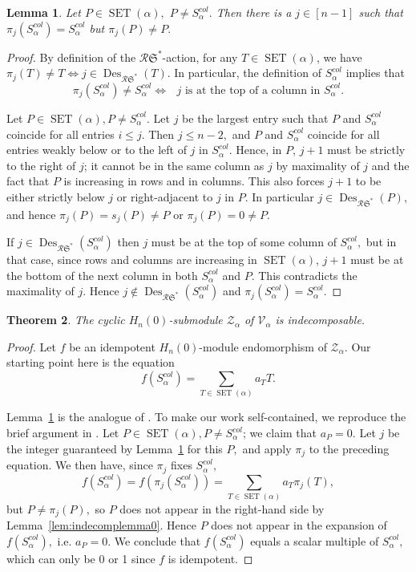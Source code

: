 \documentclass[12pt,letterpaper]{amsart}
\newtheorem{theorem}{Theorem}[section]
\newtheorem{lemma}[theorem]{Lemma}
\theoremstyle{definition}
\newcommand{\rdI}{\mathcal{R}\mathfrak{S}^*}
\DeclareMathOperator{\Des}{Des}
\newcommand{\SET}{\ensuremath{\operatorname{SET}}} \newcommand{\NSET}{\ensuremath{\operatorname{NSET}}}\newcommand{\SRCT}{\ensuremath{\operatorname{SRCT}}}
\newcommand{\hn}{H_n(0)}
\begin{document}
\begin{lemma}\label{lem:Z-indecomplemma} Let $P\in\SET(\alpha),$ $P\ne S^{col}_\alpha.$ Then there is a $j\in [n-1]$ such that $\pi_j(S^{col}_\alpha)=S^{col}_\alpha$ but $\pi_j(P)\ne P.$
\end{lemma}
\begin{proof} By definition of the $\rdI$-action, for any $T\in \SET(\alpha)$, we have 
$\pi_j(T)\ne T\iff j\in \Des_{\rdI}(T).$  In particular, the definition of $S^{col}_\alpha$ implies that 
\[\pi_j(S^{col}_\alpha)\ne S^{col}_\alpha \iff \text{ $j$ is at the top of a column in }S^{col}_\alpha.\]

Let $P\in\SET(\alpha), P\ne S^{col}_\alpha.$  Let $j$ be the largest entry such that $P$ and $S^{col}_\alpha$ coincide for all entries $i\le j.$ Then $j\le n-2,$ and $P$ and $S^{col}_\alpha$ coincide for all entries weakly below or to the left of $j$ in $S^{col}_\alpha.$ Hence, in $P$,  $j+1$ must be strictly to the right of $j$; it cannot be in the same column as $j$ by maximality of $j$ and the fact that $P$ is increasing in rows and in columns.  This also forces  $j+1$ to be either strictly below $j$  or right-adjacent to $j$ in $P$.  In particular $j\in \Des_{\rdI}(P),$ and hence  $\pi_j(P)=s_j(P)\ne P$ or  $\pi_j(P)= 0\ne P$.

If $j\in \Des_{\rdI}(S^{col}_\alpha)$ then $j$ must be at the top of some column of $S^{col}_\alpha,$ but in that case,
 since rows and columns are increasing in $\SET(\alpha)$, $j+1$ must be at the bottom of the next column in both $S^{col}_\alpha$ and $P.$ This contradicts the maximality of $j.$  Hence $j\notin \Des_{\rdI}(S^{col}_\alpha)$ and 
$\pi_j(S^{col}_\alpha)=S^{col}_\alpha.$
\end{proof}

\begin{theorem}\label{thm:Z-indecomp} The cyclic  $\hn$-submodule $\mathcal{Z}_\alpha$ of $\mathcal{V}_\alpha$ is indecomposable.
\end{theorem}

\begin{proof}  Let $f$ be an idempotent $\hn$-module endomorphism of $\mathcal{Z}_\alpha.$ 
Our starting point here is the equation 
\[f(S^{col}_\alpha)=\sum_{T\in\SET(\alpha)} a_T T.\]

Lemma~\ref{lem:Z-indecomplemma} is the analogue of 
\cite[Lemma~3.11]{BBSSZ2015}.
To make our work self-contained, we reproduce  the brief argument in \cite[Theorem~3.12]{BBSSZ2015}.   
Let $P\in \SET(\alpha), P\ne S^{col}_\alpha$; we claim that $a_P= 0.$ Let $j$ be the integer guaranteed by Lemma~\ref{lem:Z-indecomplemma} for this $P,$ and apply $\pi_j$ to the preceding equation.  We then have, since $\pi_j$ fixes $S^{col}_\alpha,$ 
\[f(S^{col}_\alpha)=f(\pi_j(S^{col}_\alpha))=\sum_{T\in \SET(\alpha)} a_T \pi_j(T),\]
but $P\ne \pi_j(P),$  so $P$ does not appear in the right-hand side by Lemma~\ref{lem:indecomplemma0}. Hence $P$ does not appear in the expansion of $f(S^{col}_\alpha),$ i.e. $a_P=0.$  
We conclude  
 that $f(S^{col}_\alpha)$ equals a scalar multiple of $S^{col}_\alpha,$ which can only be 0 or 1 since $f$ is idempotent.   \end{proof}
\end{document}
